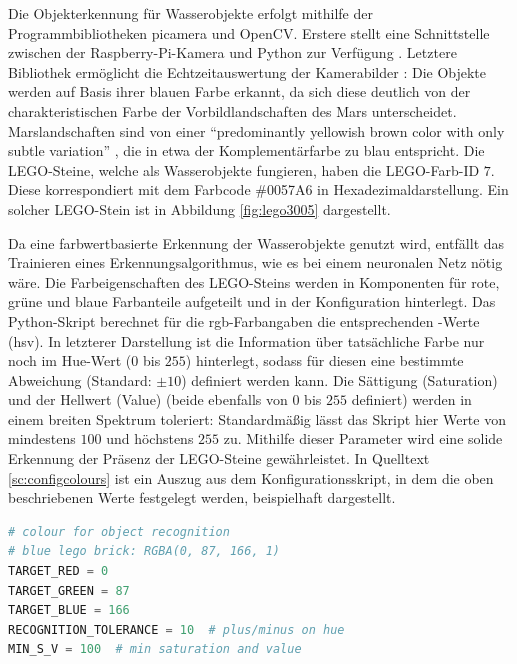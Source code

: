 Die Objekterkennung für Wasserobjekte erfolgt mithilfe der Programmbibliotheken picamera und OpenCV.
Erstere stellt eine Schnittstelle zwischen der Raspberry-Pi-Kamera und Python zur Verfügung \cite{cox2014}.
Letztere Bibliothek ermöglicht die Echtzeitauswertung der Kamerabilder \cite{pajankar2015}:
Die Objekte werden auf Basis ihrer blauen Farbe erkannt, da sich diese deutlich von der charakteristischen Farbe der Vorbildlandschaften des Mars unterscheidet.
Marslandschaften sind von einer \enquote{predominantly yellowish brown color with only subtle variation} \cite[S. 1]{maki1999}, die in etwa der Komplementärfarbe zu blau entspricht.
Die LEGO-Steine, welche als Wasserobjekte fungieren, haben die LEGO-Farb-ID $7$.
Diese korrespondiert mit dem Farbcode \#0057A6 in Hexadezimaldarstellung.
Ein solcher LEGO-Stein ist in Abbildung \ref{fig:lego3005} dargestellt.

Da eine farbwertbasierte Erkennung der Wasserobjekte genutzt wird, entfällt das Trainieren eines Erkennungsalgorithmus, wie es bei einem neuronalen Netz nötig wäre.
Die Farbeigenschaften des LEGO-Steins werden in Komponenten für rote, grüne und blaue Farbanteile aufgeteilt und in der Konfiguration hinterlegt.
Das Python-Skript berechnet für die \acs{rgb}-Farbangaben die entsprechenden -Werte (\acl{hsv}).
In letzterer Darstellung ist die Information über tatsächliche Farbe nur noch im Hue-Wert ($0$ bis $255$) hinterlegt, sodass für diesen eine bestimmte Abweichung (Standard: $\pm 10$) definiert werden kann.
Die Sättigung (Saturation) und der Hellwert (Value) (beide ebenfalls von $0$ bis $255$ definiert) werden in einem breiten Spektrum toleriert:
Standardmäßig lässt das Skript hier Werte von mindestens $100$ und höchstens $255$ zu.
Mithilfe dieser Parameter wird eine solide Erkennung der Präsenz der LEGO-Steine gewährleistet.
In Quelltext \ref{sc:configcolours} ist ein Auszug aus dem Konfigurationsskript, in dem die oben beschriebenen Werte festgelegt werden, beispielhaft dargestellt.

\begin{lstlisting}[caption={Auszug aus der Konfiguration mit Standardwerten für die farbbasierte Objekterkennung}, label={sc:configcolours}, numbers=none, language={Python}, float, abovecaptionskip=1em]
# colour for object recognition
# blue lego brick: RGBA(0, 87, 166, 1)
TARGET_RED = 0
TARGET_GREEN = 87
TARGET_BLUE = 166
RECOGNITION_TOLERANCE = 10  # plus/minus on hue
MIN_S_V = 100  # min saturation and value
\end{lstlisting}

